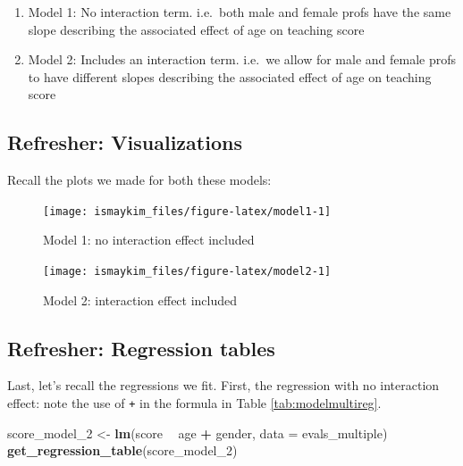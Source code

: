 \documentclass[12pt,]{krantz}
\makeatletter
\newenvironment{Shaded}{\begin{snugshade}}{\end{snugshade}}
\newcommand{\KeywordTok}[1]{\textcolor[rgb]{0.27,0.27,0.27}{\textbf{#1}}}
\newcommand{\DataTypeTok}[1]{\textcolor[rgb]{0.27,0.27,0.27}{#1}}
\newcommand{\DecValTok}[1]{\textcolor[rgb]{0.06,0.06,0.06}{#1}}
\newcommand{\StringTok}[1]{\textcolor[rgb]{0.5,0.5,0.5}{#1}}
\newcommand{\OperatorTok}[1]{\textcolor[rgb]{0.43,0.43,0.43}{\textbf{#1}}}
\newcommand{\NormalTok}[1]{#1}
\providecommand{\tightlist}{%
  \setlength{\itemsep}{0pt}\setlength{\parskip}{0pt}}
\newenvironment{kframe}{%
\medskip{}
\setlength{\fboxsep}{.8em}
 \def\at@end@of@kframe{}%
 \ifinner\ifhmode%
  \def\at@end@of@kframe{\end{minipage}}%
  \begin{minipage}{\columnwidth}%
 \fi\fi%
 \def\FrameCommand##1{\hskip\@totalleftmargin \hskip-\fboxsep
 \colorbox{shadecolor}{##1}\hskip-\fboxsep
     \hskip-\linewidth \hskip-\@totalleftmargin \hskip\columnwidth}%
 \MakeFramed {\advance\hsize-\width
   \@totalleftmargin\z@ \linewidth\hsize
   \@setminipage}}%
 {\par\unskip\endMakeFramed%
 \at@end@of@kframe}
\renewenvironment{Shaded}{\begin{kframe}}{\end{kframe}}
\makeatother
\begin{document}
\begin{enumerate}
\def\labelenumi{\arabic{enumi}.}
\tightlist
\item
  Model 1: No interaction term. i.e.~both male and female profs have the
  same slope describing the associated effect of age on teaching score
\item
  Model 2: Includes an interaction term. i.e.~we allow for male and
  female profs to have different slopes describing the associated effect
  of age on teaching score
\end{enumerate}

\subsection{Refresher: Visualizations}\label{refresher-visualizations}

Recall the plots we made for both these models:

\begin{figure}

{\centering \texttt{[image: ismaykim\_files/figure-latex/model1-1]} 

}

\caption{Model 1: no interaction effect included}\label{fig:model1}
\end{figure}

\begin{figure}

{\centering \texttt{[image: ismaykim\_files/figure-latex/model2-1]} 

}

\caption{Model 2: interaction effect included}\label{fig:model2}
\end{figure}

\subsection{Refresher: Regression
tables}\label{refresher-regression-tables}

Last, let's recall the regressions we fit. First, the regression with no
interaction effect: note the use of \texttt{+} in the formula in Table
\ref{tab:modelmultireg}.

\begin{Shaded}
\begin{Highlighting}[]
\NormalTok{score_model_}\DecValTok{2}\NormalTok{ <-}\StringTok{ }\KeywordTok{lm}\NormalTok{(score }\OperatorTok{~}\StringTok{ }\NormalTok{age }\OperatorTok{+}\StringTok{ }\NormalTok{gender, }\DataTypeTok{data =}\NormalTok{ evals_multiple)}
\KeywordTok{get_regression_table}\NormalTok{(score_model_}\DecValTok{2}\NormalTok{)}
\end{Highlighting}
\end{Shaded}
\end{document}
